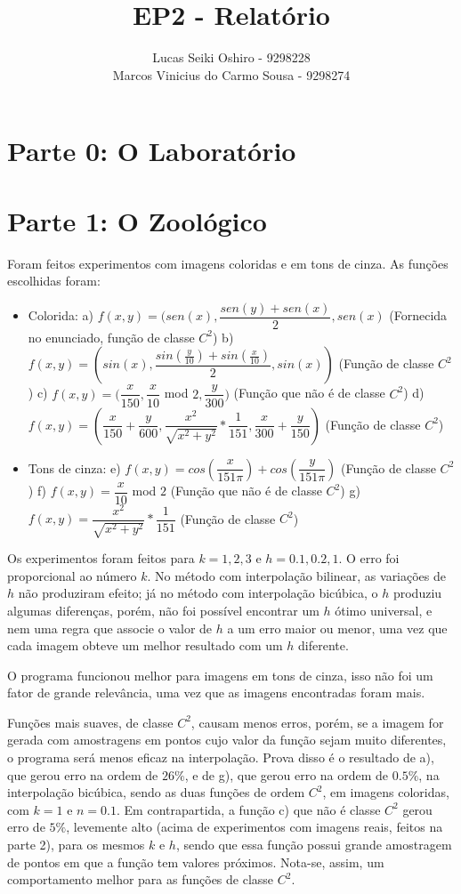 \documentclass{article}
\title{EP2 - Relatório}
\author{Lucas Seiki Oshiro - 9298228\\ Marcos Vinicius do Carmo Sousa    - 9298274}
\begin{document}
\maketitle
\section{Parte 0: O Laboratório}

\section{Parte 1: O Zoológico}
Foram feitos experimentos com imagens coloridas e em tons de cinza. As funções escolhidas foram:
\begin{itemize}
	\item Colorida:
	\subitem a) $f(x,y) = (sen(x), \dfrac{sen(y) + sen(x)}{2}, sen(x)$ (Fornecida no enunciado, função de classe $C^{2}$)
	\subitem b) $f(x,y) = (sin(x), \dfrac{sin(\frac{y}{10}) + sin(\frac{x}{10})}{2}, sin(x))$ (Função de classe $C^{2}$)	
	\subitem c) $f(x,y) = (\dfrac{x}{150}, \dfrac{x}{10}$ mod $ 2, \dfrac{y}{300})$ (Função que não é de classe $C^{2}$)
	\subitem d) $f(x,y) = (\dfrac{x}{150} + \dfrac{y}{600}, \dfrac{x^{2}}{\sqrt{x^{2} + y^{2}}} * \dfrac{1}{151}, \dfrac{x}{300} + \dfrac{y}{150})$ (Função de classe $C^{2}$)
	
	\item Tons de cinza:
	\subitem e) $f(x, y) = cos(\dfrac{x}{151\pi}) + cos(\dfrac{y}{151\pi})$ (Função de classe $C^{2}$)
	\subitem f) $f(x, y) = \dfrac{x}{10}$ mod $2$ (Função que não é de classe $C^{2}$)
	\subitem g) $f(x, y) = \dfrac{x^{2}}{\sqrt{x^{2} + y^{2}}} * \dfrac{1}{151}$	(Função de classe $C^{2}$)
\end{itemize}

Os experimentos foram feitos para $k=1, 2, 3$ e $h=0.1, 0.2, 1$. O erro foi proporcional ao número $k$. No método com interpolação bilinear, as variações de $h$ não produziram efeito; já no método com interpolação bicúbica, o $h$ produziu algumas diferenças, porém, não foi possível encontrar um $h$ ótimo universal, e nem uma regra que associe o valor de $h$ a um erro maior ou menor, uma vez que cada imagem obteve um melhor resultado com um $h$ diferente.

O programa funcionou melhor para imagens em tons de cinza, isso não foi um fator de grande relevância, uma vez que as imagens encontradas foram mais.

Funções mais suaves, de classe $C^{2}$, causam menos erros, porém, se a imagem for gerada com amostragens em pontos cujo valor da função sejam muito diferentes, o programa será menos eficaz na interpolação. Prova disso é o resultado de a), que gerou erro na ordem de $26\%$, e de g), que gerou erro na ordem de $0.5\%$, na interpolação bicúbica, sendo as duas funções de ordem $C^{2}$, em imagens coloridas, com $k = 1$ e $n = 0.1$. Em contrapartida, a função c) que não é classe $C^{2}$ gerou erro de $5\%$, levemente alto (acima de experimentos com imagens reais, feitos na parte 2), para os mesmos $k$ e $h$, sendo que essa função possui grande amostragem de pontos em que a função tem valores próximos. Nota-se, assim, um comportamento melhor para as funções de classe $C^{2}$.
\end{document}
